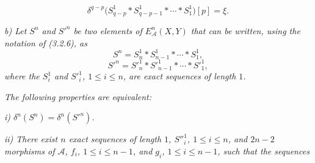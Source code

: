\begin{equation}
\delta^{q-p}\bigl(S_{q-p}^1*S_{q-p-1}^1*\cdots*S_1^1\bigr)[p]=\xi.
\tag{3.3.1.1}
\end{equation}

\noindent\textit{b) Let $S^n$ and ${S'}^n$ be two elements of
$E_{\mathcal A}^{n}(X,Y)$ that can be written, using the notation of
(3.2.6), as}
\[
S^n=S_n^1*S_{n-1}^1*\cdots*S_1^1,
\]
\[
{S'}^n={S'}_n^1*{S'}_{n-1}^1*\cdots*{S'}_1^1,
\]
\noindent\textit{where the $S_i^1$ and ${S'}_i^1$, $1\leq i\leq n$, are
exact sequences of length $1$.}

\noindent\textit{The following properties are equivalent:}

\noindent\textit{i) $\delta^n(S^n)=\delta^n({S'}^n)$.}

\noindent\textit{ii) There exist $n$ exact sequences of length $1$,
${S''}_i^1$, $1\leq i\leq n$, and $2n-2$ morphisms of $\mathcal A$,
$f_i$, $1\leq i\leq n-1$, and $g_i$, $1\leq i\leq n-1$, such that the
sequences}
\endgroup

